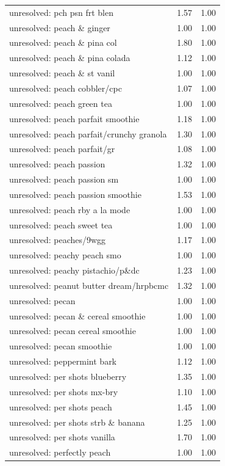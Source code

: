 \begin{table}
\begin{tabular}{lrr}
unresolved: pch psn frt blen & 1.57 & 1.00 \\
unresolved: peach \& ginger & 1.00 & 1.00 \\
unresolved: peach \& pina col & 1.80 & 1.00 \\
unresolved: peach \& pina colada & 1.12 & 1.00 \\
unresolved: peach \& st vanil & 1.00 & 1.00 \\
unresolved: peach cobbler/cpc & 1.07 & 1.00 \\
unresolved: peach green tea & 1.00 & 1.00 \\
unresolved: peach parfait smoothie & 1.18 & 1.00 \\
unresolved: peach parfait/crunchy granola & 1.30 & 1.00 \\
unresolved: peach parfait/gr & 1.08 & 1.00 \\
unresolved: peach passion & 1.32 & 1.00 \\
unresolved: peach passion sm & 1.00 & 1.00 \\
unresolved: peach passion smoothie & 1.53 & 1.00 \\
unresolved: peach rby a la mode & 1.00 & 1.00 \\
unresolved: peach sweet tea & 1.00 & 1.00 \\
unresolved: peaches/9wgg & 1.17 & 1.00 \\
unresolved: peachy peach smo & 1.00 & 1.00 \\
unresolved: peachy pistachio/p\&dc & 1.23 & 1.00 \\
unresolved: peanut butter dream/hrpbcmc & 1.32 & 1.00 \\
unresolved: pecan & 1.00 & 1.00 \\
unresolved: pecan \& cereal smoothie & 1.00 & 1.00 \\
unresolved: pecan cereal smoothie & 1.00 & 1.00 \\
unresolved: pecan smoothie & 1.00 & 1.00 \\
unresolved: peppermint bark & 1.12 & 1.00 \\
unresolved: per shots blueberry & 1.35 & 1.00 \\
unresolved: per shots mx-bry & 1.10 & 1.00 \\
unresolved: per shots peach & 1.45 & 1.00 \\
unresolved: per shots strb \& banana & 1.25 & 1.00 \\
unresolved: per shots vanilla & 1.70 & 1.00 \\
unresolved: perfectly peach & 1.00 & 1.00 \\

\end{tabular}
\end{table}
